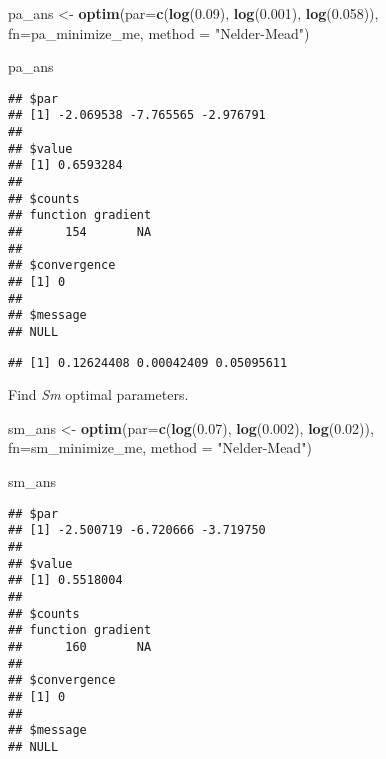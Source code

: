 \documentclass[]{article}
\newenvironment{Shaded}{\begin{snugshade}}{\end{snugshade}}
\newcommand{\KeywordTok}[1]{\textcolor[rgb]{0.13,0.29,0.53}{\textbf{#1}}}
\newcommand{\DataTypeTok}[1]{\textcolor[rgb]{0.13,0.29,0.53}{#1}}
\newcommand{\FloatTok}[1]{\textcolor[rgb]{0.00,0.00,0.81}{#1}}
\newcommand{\StringTok}[1]{\textcolor[rgb]{0.31,0.60,0.02}{#1}}
\newcommand{\OperatorTok}[1]{\textcolor[rgb]{0.81,0.36,0.00}{\textbf{#1}}}
\newcommand{\NormalTok}[1]{#1}
\begin{document}
\begin{Shaded}
\begin{Highlighting}[]
\NormalTok{pa_ans <-}\StringTok{ }\KeywordTok{optim}\NormalTok{(}\DataTypeTok{par=}\KeywordTok{c}\NormalTok{(}\KeywordTok{log}\NormalTok{(}\FloatTok{0.09}\NormalTok{), }\KeywordTok{log}\NormalTok{(}\FloatTok{0.001}\NormalTok{), }\KeywordTok{log}\NormalTok{(}\FloatTok{0.058}\NormalTok{)), }
             \DataTypeTok{fn=}\NormalTok{pa_minimize_me,}
             \DataTypeTok{method =} \StringTok{"Nelder-Mead"}\NormalTok{)}

\NormalTok{pa_ans}
\end{Highlighting}
\end{Shaded}

\begin{verbatim}
## $par
## [1] -2.069538 -7.765565 -2.976791
## 
## $value
## [1] 0.6593284
## 
## $counts
## function gradient 
##      154       NA 
## 
## $convergence
## [1] 0
## 
## $message
## NULL
\end{verbatim}

\begin{Shaded}
\end{Shaded}

\begin{verbatim}
## [1] 0.12624408 0.00042409 0.05095611
\end{verbatim}

Find \emph{Sm} optimal parameters.

\begin{Shaded}
\begin{Highlighting}[]
\NormalTok{sm_ans <-}\StringTok{ }\KeywordTok{optim}\NormalTok{(}\DataTypeTok{par=}\KeywordTok{c}\NormalTok{(}\KeywordTok{log}\NormalTok{(}\FloatTok{0.07}\NormalTok{), }\KeywordTok{log}\NormalTok{(}\FloatTok{0.002}\NormalTok{), }\KeywordTok{log}\NormalTok{(}\FloatTok{0.02}\NormalTok{)), }
             \DataTypeTok{fn=}\NormalTok{sm_minimize_me,}
             \DataTypeTok{method =} \StringTok{"Nelder-Mead"}\NormalTok{)}

\NormalTok{sm_ans}
\end{Highlighting}
\end{Shaded}

\begin{verbatim}
## $par
## [1] -2.500719 -6.720666 -3.719750
## 
## $value
## [1] 0.5518004
## 
## $counts
## function gradient 
##      160       NA 
## 
## $convergence
## [1] 0
## 
## $message
## NULL
\end{verbatim}
\end{document}
